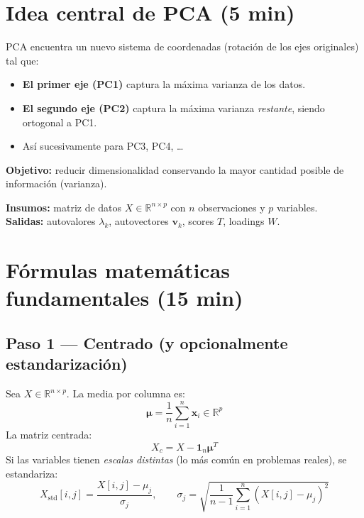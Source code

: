 \documentclass[11pt,a4paper]{article}
\newcommand{\R}{\mathbb{R}}
\begin{document}
\section{Idea central de PCA (5 min)}

\begin{formulabox}
PCA encuentra un nuevo sistema de coordenadas (rotación de los ejes originales) tal que:
\begin{itemize}[leftmargin=*]
    \item \textbf{El primer eje (PC1)} captura la máxima varianza de los datos.
    \item \textbf{El segundo eje (PC2)} captura la máxima varianza \emph{restante}, siendo ortogonal a PC1.
    \item Así sucesivamente para PC3, PC4, \ldots
\end{itemize}
\textbf{Objetivo:} reducir dimensionalidad conservando la mayor cantidad posible de información (varianza).
\end{formulabox}

\textbf{Insumos:} matriz de datos $X \in \R^{n \times p}$ con $n$ observaciones y $p$ variables.\\
\textbf{Salidas:} autovalores $\lambda_k$, autovectores $\mathbf{v}_k$, scores $T$, loadings $W$.

\section{Fórmulas matemáticas fundamentales (15 min)}

\subsection{Paso 1 — Centrado (y opcionalmente estandarización)}

\begin{formulabox}
Sea $X \in \R^{n \times p}$. La media por columna es:
\[
\bm{\mu} = \frac{1}{n}\sum_{i=1}^{n} \mathbf{x}_i \in \R^{p}
\]
La matriz centrada:
\[
X_c = X - \mathbf{1}_n\bm{\mu}^{T}
\]
Si las variables tienen \emph{escalas distintas} (lo más común en problemas reales), se estandariza:
\[
X_{\text{std}}[i,j] = \frac{X[i,j] - \mu_j}{\sigma_j}, \qquad
\sigma_j = \sqrt{\frac{1}{n-1}\sum_{i=1}^{n}(X[i,j]-\mu_j)^2}
\]
\end{formulabox}
\end{document}
